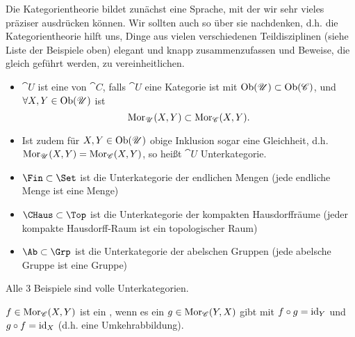 \begin{dremark}
    Die Kategorientheorie bildet zunächst eine Sprache, mit der wir sehr vieles präziser ausdrücken können. Wir sollten auch so über sie nachdenken, d.h. die Kategorientheorie hilft uns, Dinge aus vielen verschiedenen Teildisziplinen (siehe Liste der Beispiele oben) elegant und knapp zusammenzufassen und Beweise, die gleich geführt werden, zu vereinheitlichen.
\end{dremark}

\begin{definition}[Unterkategorie]\label{def:unterkategorie}
    \begin{itemize}
        \item $\cat{U}$ ist eine  von $\cat{C}$, falls $\cat{U}$ eine Kategorie ist mit $\operatorname{Ob}(\mathscr{U}) \subset \operatorname{Ob}(\mathscr{C})$, und $\forall X,Y\in \operatorname{Ob}(\mathscr{U})$ ist
    \[
        \operatorname{Mor}_{\mathscr{U}}(X,Y) \subset \operatorname{Mor}_{\mathscr{C}}(X,Y)
    .\] 
\item Ist zudem für $X,Y \in \operatorname{Ob}(\mathscr{U})$ obige Inklusion sogar eine Gleichheit, d.h. $\operatorname{Mor}_{\mathscr{U}}(X,Y) = \operatorname{Mor}_{\mathscr{C}}(X,Y)$, so heißt $\cat{U}$  Unterkategorie. 
    \end{itemize}
\end{definition}

\begin{example}
    \begin{itemize}
        \item $\Fin \subset \Set$ ist die Unterkategorie der endlichen Mengen (jede endliche Menge ist eine Menge)
        \item $\CHaus \subset \Top$ ist die Unterkategorie der kompakten Hausdorffräume (jeder kompakte Hausdorff-Raum ist ein topologischer Raum)
        \item $\Ab\subset \Grp$ ist die Unterkategorie der abelschen Gruppen (jede abelsche Gruppe ist eine Gruppe)
    \end{itemize}
    Alle 3 Beispiele sind volle Unterkategorien.
\end{example}

\begin{definition}[Isomorphismus]\label{def:isomorphismus}
    $f\in \operatorname{Mor}_{\mathscr{C}}(X,Y)$ ist ein , wenn es ein $g\in \operatorname{Mor}_{\mathscr{C}}(Y,X)$ gibt mit $f \circ  g = \mathrm{id}_Y$ und $g \circ f = \mathrm{id}_X$ (d.h. eine Umkehrabbildung).
\end{definition}

